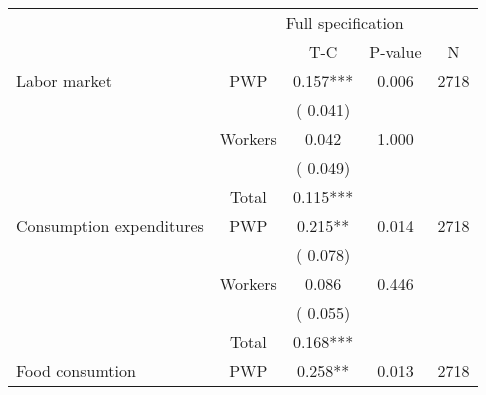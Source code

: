 
\begin{tabular}{l*{4}{c}}\hline&\multicolumn{4}{c}{Full specification} \\ \cmidrule(r){2-5} & {} & {T-C} & {P-value} & {N}  \\ \midrule
 Labor market                 &       PWP     &              0.157***                 &        0.006    & 2718                               \\  
                               &                               &       (       0.041)                              & &                                                                             \\ 
                               &       Workers         &              0.042                 &        1.000    &                                               \\ 
                               &                               &       (       0.049)                              & &                                                                             \\ 
\cmidrule{2-3}
                               &       Total           &              0.115***                 &    &                                               \\ 
\cmidrule{2-3}
 Consumption expenditures                 &       PWP     &              0.215**                 &        0.014    & 2718                               \\ 
                               &                               &       (       0.078)                              & &                                                                             \\ 
                               &       Workers         &              0.086                 &        0.446    &                                               \\ 
                               &                               &       (       0.055)                              & &                                                                             \\ 
\cmidrule{2-3}
                               &       Total           &              0.168***                 &    &                                               \\ 
\cmidrule{2-3}
 Food consumtion                 &       PWP     &              0.258**                 &        0.013    & 2718                               \\ 

\end{tabular}
